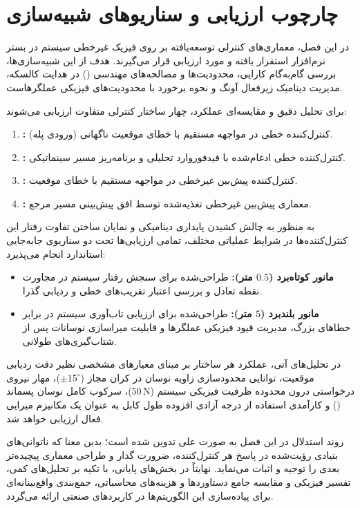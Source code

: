 
\section{چارچوب ارزیابی و سناریوهای شبیه‌سازی}

در این فصل، معماری‌های کنترلی توسعه‌یافته بر روی فیزیک غیرخطی سیستم در بستر نرم‌افزار  استقرار یافته و مورد ارزیابی قرار می‌گیرند. هدف از این شبیه‌سازی‌ها، بررسی گام‌به‌گام کارایی، محدودیت‌ها و مصالحه‌های مهندسی () در هدایت کالسکه، مدیریت دینامیک زیرفعال آونگ و نحوه برخورد با محدودیت‌های فیزیکی عملگرهاست.

برای تحلیل دقیق و مقایسه‌ای عملکرد، چهار ساختار کنترلی متفاوت ارزیابی می‌شوند:
\begin{enumerate}
    \item \textbf{:} کنترل‌کننده خطی در مواجهه مستقیم با خطای موقعیت ناگهانی (ورودی پله).
    \item \textbf{:} کنترل‌کننده خطی ادغام‌شده با فیدفوروارد تحلیلی و برنامه‌ریز مسیر سینماتیکی.
    \item \textbf{:} کنترل‌کننده پیش‌بین غیرخطی در مواجهه مستقیم با خطای موقعیت.
    \item \textbf{:} معماری پیش‌بین غیرخطی تغذیه‌شده توسط افق پیش‌بینی مسیر مرجع.
\end{enumerate}

به منظور به چالش کشیدن پایداری دینامیکی و نمایان ساختن تفاوت رفتار این کنترل‌کننده‌ها در شرایط عملیاتی مختلف، تمامی ارزیابی‌ها تحت دو سناریوی جابه‌جایی استاندارد انجام می‌پذیرد:
\begin{itemize}
    \item \textbf{مانور کوتاه‌برد ($0.5$ متر):} طراحی‌شده برای سنجش رفتار سیستم در مجاورت نقطه تعادل و بررسی اعتبار تقریب‌های خطی و ردیابی گذرا.
    \item \textbf{مانور بلندبرد ($5$ متر):} طراحی‌شده برای ارزیابی تاب‌آوری سیستم در برابر خطاهای بزرگ، مدیریت قیود فیزیکی عملگرها و قابلیت میراسازی نوسانات پس از شتاب‌گیری‌های طولانی.
\end{itemize}

در تحلیل‌های آتی، عملکرد هر ساختار بر مبنای معیارهای مشخصی نظیر دقت ردیابی موقعیت، توانایی محدودسازی زاویه نوسان در کران مجاز ($\pm15^\circ$)، مهار نیروی درخواستی درون محدوده ظرفیت فیزیکی سیستم ($50\,\mathrm{N}$)، سرکوب کامل نوسان پسماند () و کارآمدی استفاده از درجه آزادی افزوده طول کابل به عنوان یک مکانیزم میرایی فعال ارزیابی خواهد شد.

روند استدلال در این فصل به صورت علی تدوین شده است؛ بدین معنا که ناتوانی‌های بنیادی رؤیت‌شده در پاسخ هر کنترل‌کننده، ضرورت گذار و طراحی معماری پیچیده‌تر بعدی را توجیه و اثبات می‌نماید. نهایتاً در بخش‌های پایانی، با تکیه بر تحلیل‌های کمی، تفسیر فیزیکی و مقایسه جامع دستاوردها و هزینه‌های محاسباتی، جمع‌بندی واقع‌بینانه‌ای برای پیاده‌سازی این الگوریتم‌ها در کاربردهای صنعتی ارائه می‌گردد.